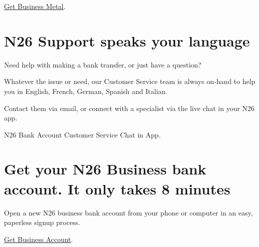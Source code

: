 \documentclass[onsided]{book}
\numberwithin{equation}{section}
\begin{document}
\href{https://get.n26.com/?_ga=2.185705065.1189510936.1611884241-1079622474.1611780638}{Get Business Metal}.

\section{N26 Support speaks your language}
Need help with making a bank transfer, or just have a question?

Whatever the issue or need, our Customer Service team is always on-hand to help you in English, French, German, Spanish and Italian.

Contact them via email, or connect with a specialist via the live chat in your N26 app.

N26 Bank Account Customer Service Chat in App.

\section{Get your N26 Business bank account. It only takes 8 minutes}
Open a new N26 business bank account from your phone or computer in an easy, paperless signup process.

\href{https://get.n26.com/?ch=businessAccountPage&pr=n26Business&_ga=2.178448740.1189510936.1611884241-1079622474.1611780638}{Get Business Account}.
\end{document}
